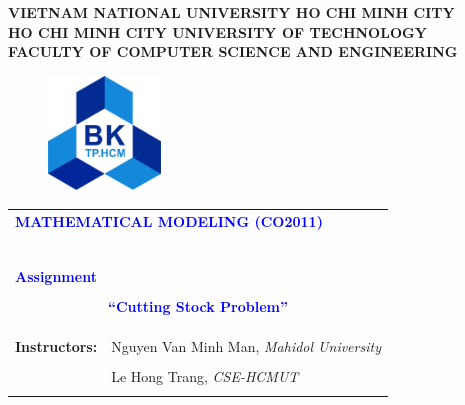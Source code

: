 \documentclass[a4paper]{article}
\begin{document}
\begin{titlepage}
\begin{center}
\textbf{\Large VIETNAM NATIONAL UNIVERSITY HO CHI MINH CITY} \\

\vspace{7pt}
\textbf{\Large HO CHI MINH CITY UNIVERSITY OF TECHNOLOGY} \\

\vspace{7pt}
\textbf{\Large FACULTY OF COMPUTER SCIENCE AND ENGINEERING}
\end{center}

\vspace{1cm}

\begin{figure}[h!]
\begin{center}
\includegraphics[width=3cm]{Images/hcmut.png}
\end{center}
\end{figure}

\vspace{1cm}


\begin{center}
\begin{tabular}{ccc}
	\multicolumn{3}{l}{\textbf{{\Large \textcolor{blue}{MATHEMATICAL MODELING (CO2011)}}}}\\
	~~\\
	\arrayrulecolor{blue}\hline
	\\
	\multicolumn{3}{l}{\textbf{{\Large \textcolor{blue}{Assignment} }}}\\
	\\
	
	\multicolumn{3}{c}{\textbf{{\Huge \textcolor{blue}{“Cutting Stock Problem”}}}}\\
	\\
    
	\arrayrulecolor{blue}\hline \\ \\

    \multicolumn{1}{r}{\textbf{\Large Instructors:}} & \multicolumn{2}{l}{\Large Nguyen Van Minh Man, \textit{Mahidol University}} \\ \\
    \multicolumn{1}{r}{} & \multicolumn{2}{l}{\Large Le Hong Trang, \textit{CSE-HCMUT}} \\ \\


\end{tabular}
\end{center}
\end{titlepage}
\end{document}
